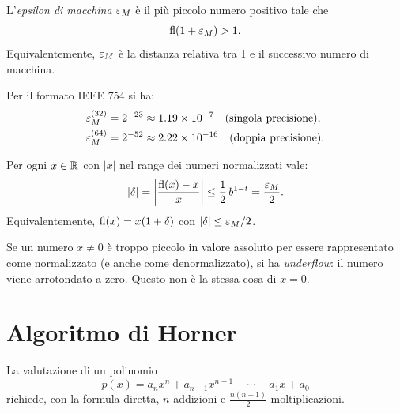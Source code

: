 \begin{definition}
L'\emph{epsilon di macchina} $\varepsilon_M$ è il più piccolo numero positivo tale che
\begin{equation}
  \operatorname{fl}(1 + \varepsilon_M) > 1.
  \label{eq:eps}
\end{equation}
Equivalentemente, $\varepsilon_M$ è la distanza relativa tra 1 e il successivo numero di
macchina.
\end{definition}

Per il formato IEEE 754 si ha:
\begin{align}
  \varepsilon_M^{(32)} &= 2^{-23} \approx 1.19 \times 10^{-7} \quad \text{(singola precisione)}, \\
  \varepsilon_M^{(64)} &= 2^{-52} \approx 2.22 \times 10^{-16} \quad \text{(doppia precisione)}.
\end{align}

\begin{theorem}
\label{thm:errore_rel}
Per ogni $x \in \mathbb{R}$ con $|x|$ nel range dei numeri normalizzati vale:
\begin{equation}
  |\delta| = \left|\frac{\operatorname{fl}(x) - x}{x}\right| \leq \frac{1}{2}\, b^{1-t} = \frac{\varepsilon_M}{2}.
  \label{eq:bound_errore}
\end{equation}
Equivalentemente, $\operatorname{fl}(x) = x(1 + \delta)$ con $|\delta| \leq \varepsilon_M/2$.
\end{theorem}

\begin{remark}[Underflow]
Se un numero $x \neq 0$ è troppo piccolo in valore assoluto per essere rappresentato
come normalizzato (e anche come denormalizzato), si ha \emph{underflow}: il numero
viene arrotondato a zero. Questo non è la stessa cosa di $x = 0$.
\end{remark}

\section{Algoritmo di Horner}
\label{sec:horner}

La valutazione di un polinomio
\begin{equation}
  p(x) = a_n x^n + a_{n-1} x^{n-1} + \cdots + a_1 x + a_0
  \label{eq:polinomio}
\end{equation}
richiede, con la formula diretta, $n$ addizioni e $\frac{n(n+1)}{2}$ moltiplicazioni.

